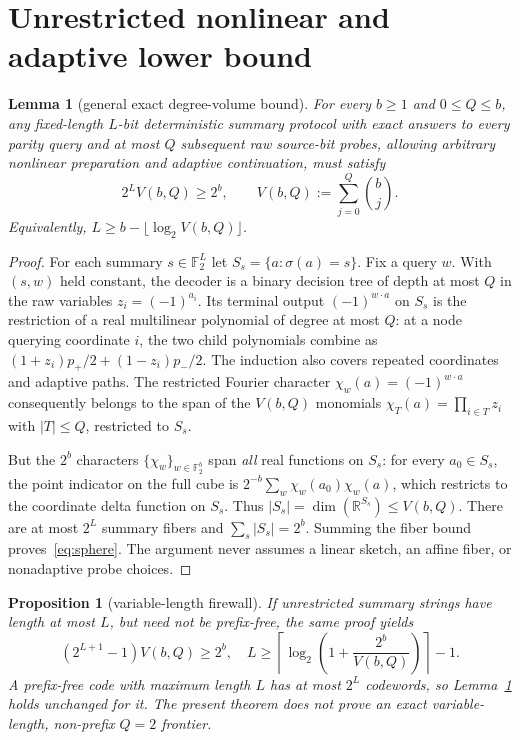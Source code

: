 \documentclass[10pt]{article}
\newtheorem{lemma}[theorem]{Lemma}
\newtheorem{proposition}[theorem]{Proposition}
\newcommand{\F}{\mathbb F_2}
\begin{document}
\section{Unrestricted nonlinear and adaptive lower bound}
\begin{lemma}[general exact degree-volume bound]\label{lem:general}
For every $b\ge1$ and $0\le Q\le b$, any fixed-length $L$-bit deterministic summary protocol with exact answers to every parity query and at most $Q$ subsequent raw source-bit probes, allowing arbitrary nonlinear preparation and adaptive continuation, must satisfy
\begin{equation}\label{eq:sphere}
\boxed{2^L V(b,Q)\ge2^b,\qquad V(b,Q):=\sum_{j=0}^Q\binom bj.}
\end{equation}
Equivalently, $L\ge b-\lfloor\log_2 V(b,Q)\rfloor$.
\end{lemma}
\begin{proof}
For each summary $s\in\F^L$ let $S_s=\{a:\sigma(a)=s\}$. Fix a query $w$. With $(s,w)$ held constant, the decoder is a binary decision tree of depth at most $Q$ in the raw variables $z_i=(-1)^{a_i}$. Its terminal output $(-1)^{w\cdot a}$ on $S_s$ is the restriction of a real multilinear polynomial of degree at most $Q$: at a node querying coordinate $i$, the two child polynomials combine as $(1+z_i)p_+/2+(1-z_i)p_-/2$. The induction also covers repeated coordinates and adaptive paths. The restricted Fourier character $\chi_w(a)=(-1)^{w\cdot a}$ consequently belongs to the span of the $V(b,Q)$ monomials $\chi_T(a)=\prod_{i\in T}z_i$ with $|T|\le Q$, restricted to $S_s$.

But the $2^b$ characters $\{\chi_w\}_{w\in\F^b}$ span \emph{all} real functions on $S_s$: for every $a_0\in S_s$, the point indicator on the full cube is $2^{-b}\sum_w\chi_w(a_0)\chi_w(a)$, which restricts to the coordinate delta function on $S_s$. Thus $|S_s|=\dim(\mathbb R^{S_s})\le V(b,Q)$. There are at most $2^L$ summary fibers and $\sum_s|S_s|=2^b$. Summing the fiber bound proves~\eqref{eq:sphere}. The argument never assumes a linear sketch, an affine fiber, or nonadaptive probe choices.
\end{proof}

\begin{proposition}[variable-length firewall]\label{rem:varlength}
If unrestricted summary strings have length at most $L$, but need not be prefix-free, the same proof yields
\[
(2^{L+1}-1)V(b,Q)\ge2^b,
\quad L\ge\left\lceil\log_2\!\left(1+\frac{2^b}{V(b,Q)}\right)\right\rceil-1.
\]
A prefix-free code with maximum length $L$ has at most $2^L$ codewords, so Lemma~\ref{lem:general} holds unchanged for it. The present theorem does not prove an exact variable-length, non-prefix $Q=2$ frontier.
\end{proposition}
\end{document}
